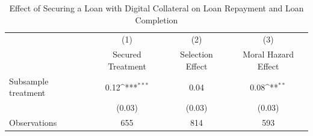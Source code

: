 \begin{table}[htbp]\centering
\def\sym#1{\ifmmode^{#1}\else\(^{#1}\)\fi}
\caption{Effect of Securing a Loan with Digital Collateral on Loan Repayment and Loan Completion\label{LASMH\_repay\_ITT\_100}}
\begin{tabular}{l*{3}{c}}
\toprule
                    &\multicolumn{1}{c}{(1)}&\multicolumn{1}{c}{(2)}&\multicolumn{1}{c}{(3)}\\
                    &\multicolumn{1}{c}{Secured Treatment}&\multicolumn{1}{c}{Selection Effect}&\multicolumn{1}{c}{Moral Hazard Effect}\\
\midrule
Subsample treatment &        0.12\sym{***}&        0.04         &        0.08\sym{**} \\
                    &      (0.03)         &      (0.03)         &      (0.03)         \\
\midrule
Observations        &         655         &         814         &         593         \\
\bottomrule
\end{tabular}
\end{table}

